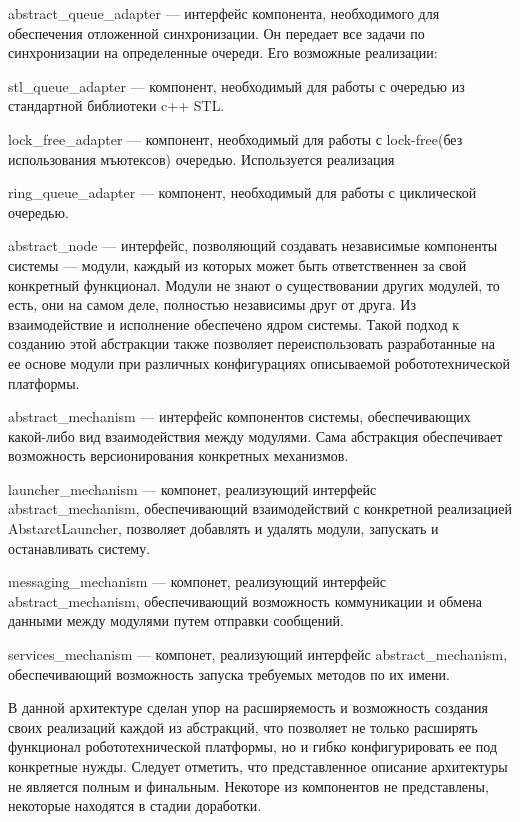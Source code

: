 abstract\_queue\_adapter --- интерфейс компонента, необходимого для обеспечения отложенной синхронизации. Он передает все задачи по синхронизации на определенные очереди. Его возможные реализации:

stl\_queue\_adapter --- компонент, необходимый для работы с очередью из стандартной библиотеки c++ STL.

lock\_free\_adapter --- компонент, необходимый для работы с lock-free(без использования мъютексов) очередью. Используется реализация 

ring\_queue\_adapter --- компонент, необходимый для работы с  циклической очередью. 

abstract\_node --- интерфейс, позволяющий создавать независимые компоненты системы --- модули, каждый из которых может быть ответственнен за свой конкретный функционал. Модули не знают о существовании других модулей, то есть, они на самом деле, полностью независимы друг от друга. Из взаимодействие и исполнение обеспечено ядром системы. Такой подход к созданию этой абстракции также позволяет переиспользовать разработанные на ее основе модули при различных конфигурациях описываемой робототехнической платформы. 

abstract\_mechanism --- интерфейс компонентов системы, обеспечивающих какой-либо вид взаимодействия между модулями. Сама абстракция обеспечивает возможность версионирования конкретных механизмов.

launcher\_mechanism --- компонет, реализующий интерфейс abstract\_mechanism, обеспечивающий взаимодействий с конкретной реализацией AbstarctLauncher, позволяет добавлять и удалять модули, запускать и останавливать систему.

messaging\_mechanism --- компонет, реализующий интерфейс abstract\_mechanism, обеспечивающий возможность коммуникации и обмена данными между модулями путем отправки сообщений.

services\_mechanism --- компонет, реализующий интерфейс abstract\_mechanism, обеспечивающий возможность запуска требуемых методов по их имени.

В данной архитектуре сделан упор на расширяемость и возможность создания своих реализаций каждой из абстракций, что позволяет не только расширять функционал робототехнической платформы, но и гибко конфигурировать ее под конкретные нужды. Следует отметить, что представленное описание архитектуры не является полным и финальным. Некоторе из компонентов не представлены, некоторые находятся в стадии доработки. 

